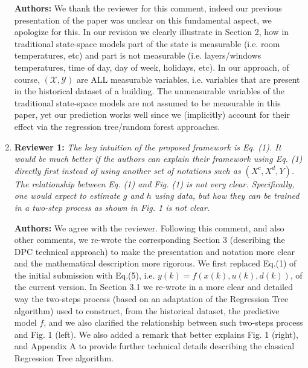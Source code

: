 \documentclass{article}
\begin{document}
\begin{enumerate}
\textbf{Authors:} We thank the reviewer for this comment, indeed our previous presentation of the paper was unclear on this fundamental aspect, we apologize for this. In our revision we clearly illustrate in Section 2, how in traditional state-space models part of the state is measurable (i.e. room temperatures, etc) and part is not measurable (i.e. layers/windows temperatures, time of day, day of week, holidays, etc). In our approach, of course, $(\mathcal{X}, \mathcal{Y})$ are ALL measurable variables, i.e. variables that are present in the historical dataset of a building. The unmeasurable variables of the traditional state-space models are not assumed to be measurable in this paper, yet our prediction works well since we (implicitly) account for their effect via the regression tree/random forest approaches.



\item \textbf{Reviewer 1:} \textit{The key intuition of the proposed framework is Eq. (1). It would be much better if the authors can explain their framework using Eq. (1) directly first instead of using another set of notations such as $(X^c, X^d, Y)$. The relationship between Eq. (1) and Fig. (1) is not very clear. Specifically, one would expect to estimate $g$ and $h$ using data, but how they can be trained in a two-step process as shown in Fig. 1 is not clear.}



\textbf{Authors:} We agree with the reviewer. Following this comment, and also other comments, we re-wrote the corresponding Section 3 (describing the DPC technical approach) to make the presentation and notation more clear and the mathematical description more rigorous. We first replaced Eq.(1) of the initial submission with Eq.(5), i.e. $y(k)=f(x(k),u(k),d(k))$, of the current version. In Section 3.1 we re-wrote in a more clear and detailed way the two-steps process (based on an adaptation of the Regression Tree algorithm) used to construct, from the historical dataset, the predictive model $f$, and we also clarified the relationship between such two-steps process and Fig. 1 (left). We also added a remark that better explains Fig. 1 (right), and Appendix A to provide further technical details describing the classical Regression Tree algorithm.


\end{enumerate}


\end{document}
